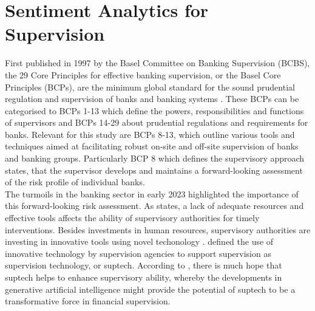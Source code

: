 \chapter{Sentiment Analytics for Supervision}\label{sec2}
\thispagestyle{empty}

First published in 1997 by the Basel Committee on Banking Supervision (BCBS), the 29 Core Principles for effective banking supervision, or the Basel Core Principles (BCPs), are the minimum global standard for the sound prudential regulation and supervision of banks and banking systems \citep{bis2024}. These BCPs can be categorised to BCPs 1-13 which define the powers, responsibilities and functions of supervisors and BCPs 14-29 about prudential regulations and requirements for banks. Relevant for this study are BCPs 8-13, which outline various tools and techniques aimed at facilitating robust on-site and off-site supervision of banks and banking groups. Particularly BCP 8 which defines the supervisory approach states, that the supervisor develops and maintains a forward-looking assessment of the risk profile of individual banks. \\


The turmoils in the banking sector in early 2023 highlighted the importance of this forward-looking risk assessment. As \cite{prenio2024} states, a lack of adequate resources and effective tools affects the ability of supervisory authorities for timely interventions. Besides investments in human resources, supervisory authorities are investing in innovative tools using novel techonology \citep{prenio2024}. \cite{broeders2018} defined the use of innovative technology by supervision agencies to support supervision as supervision technology, or suptech. According to \cite{prenio2024}, there is much hope that suptech helps to enhance supervisory ability, whereby the developments in generative artificial intelligence might provide the potential of suptech to be a transformative force in financial supervision. \\

